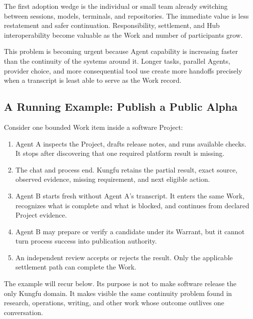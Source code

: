 The first adoption wedge is the individual or small team already switching
between sessions, models, terminals, and repositories. The immediate value is
less restatement and safer continuation. Responsibility, settlement, and Hub
interoperability become valuable as the Work and number of participants grow.

This problem is becoming urgent because Agent capability is increasing faster
than the continuity of the systems around it. Longer tasks, parallel Agents,
provider choice, and more consequential tool use create more handoffs precisely
when a transcript is least able to serve as the Work record.

\subsection{A Running Example: Publish a Public Alpha}

Consider one bounded Work item inside a software Project:


\begin{enumerate}[leftmargin=*]
  \item Agent A inspects the Project, drafts release notes, and runs available
  checks. It stops after discovering that one required platform result is
  missing.
  \item The chat and process end. Kungfu retains the partial result, exact
  source, observed evidence, missing requirement, and next eligible action.
  \item Agent B starts fresh without Agent A's transcript. It enters the same
  Work, recognizes what is complete and what is blocked, and continues from
  declared Project evidence.
  \item Agent B may prepare or verify a candidate under its Warrant, but it
  cannot turn process success into publication authority.
  \item An independent review accepts or rejects the result. Only the
  applicable settlement path can complete the Work.
\end{enumerate}

The example will recur below. Its purpose is not to make software release the
only Kungfu domain. It makes visible the same continuity problem found in
research, operations, writing, and other work whose outcome outlives one
conversation.

